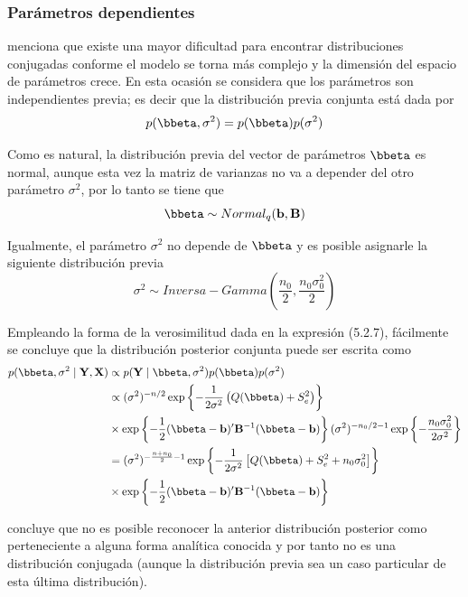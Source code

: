 \subsubsection*{Parámetros dependientes}

 menciona que existe una mayor dificultad para encontrar distribuciones conjugadas conforme el modelo se torna más complejo y la dimensión del espacio de parámetros crece. En esta ocasión se considera que los parámetros son independientes previa; es decir que la distribución previa conjunta está dada por
\begin{equation*}
p(\bbeta,\sigma^2)=p(\bbeta)p(\sigma^2)
\end{equation*}

Como es natural, la distribución previa del vector de parámetros $\bbeta$ es normal, aunque esta vez la matriz de varianzas no va a depender del otro parámetro $\sigma^2$, por lo tanto se tiene que
\begin{equation*}
\bbeta \sim Normal_q(\mathbf{b},\mathbf{B})
\end{equation*}

Igualmente, el parámetro $\sigma^2$ no depende de $\bbeta$ y es posible asignarle la siguiente distribución previa
\begin{equation*}
\sigma^2\sim Inversa-Gamma\left(\frac{n_0}{2},\frac{n_0\sigma^2_0}{2}\right)
\end{equation*}

Empleando la forma de la verosimilitud dada en la expresión (5.2.7), fácilmente se concluye que la distribución posterior conjunta puede ser escrita como
\begin{align}
p(\bbeta,\sigma^2 \mid \mathbf{Y},\mathbf{X})&\propto p(\mathbf{Y} \mid \bbeta,\sigma^2)p(\bbeta)p(\sigma^2)\notag \\
&\propto (\sigma^2)^{-n/2} \exp\left\{-\frac{1}{2\sigma^2}\left(Q(\bbeta)+S^2_e\right)\right\}\notag\\
&\times
\exp\left\{-\frac{1}{2}(\bbeta-\mathbf{b})'\mathbf{B}^{-1}(\bbeta-\mathbf{b})\right\}
(\sigma^2)^{-n_0/2-1} \exp\left\{-\frac{n_0\sigma^2_0}{2\sigma^2}\right\}\notag\\
&=(\sigma^2)^{-\frac{n+n_0}{2}-1}
\exp\left\{-\frac{1}{2\sigma^2}\left[Q(\bbeta)+S^2_e+n_0\sigma^2_0\right]\right\} \notag \\
&\times
\exp\left\{-\frac{1}{2}(\bbeta-\mathbf{b})'\mathbf{B}^{-1}(\bbeta-\mathbf{b})\right\}
\end{align}

 concluye que no es posible reconocer la anterior distribución posterior como perteneciente a alguna forma analítica conocida y por tanto no es una distribución conjugada (aunque la distribución previa sea un caso particular de esta última distribución).

